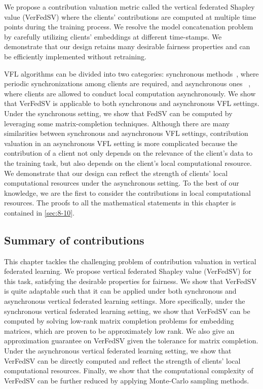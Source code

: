 We propose a contribution valuation metric called the vertical federated Shapley value (VerFedSV)
where the clients' contributions are computed at multiple time points during the training process. We resolve the model concatenation problem by carefully utilizing clients' embeddings at different time-stamps. 
We demonstrate that our design retains many desirable fairness properties and can be efficiently implemented without retraining. 

VFL algorithms can be divided into two categories: synchronous methods~\citep{Gong2016PrivateDA,Zhang2018FeatureDistributedSF,liu2019communication}, where periodic synchronizations
 among clients are required, and asynchronous ones
 ~\citep{Hu2019FDMLAC,Gu2020PrivacyPreservingAF,chen2020vafl}, where clients are allowed to conduct local computation asynchronously. We show that VerFedSV is applicable to both synchronous and asynchronous VFL settings. Under the synchronous setting, we show that FedSV can be computed by leveraging some matrix-completion techniques. Although there are many similarities between synchronous and asynchronous VFL settings, contribution valuation in an asynchronous VFL setting is more complicated because the contribution of a client not only depends on the relevance of the client's data to the training task, but also depends on the client's local computational resource. We demonstrate that our design can reflect the strength of clients' local computational resources under the asynchronous setting. To the best of our knowledge, we are the first to consider the contributions in local computational resources. The proofs to all the mathematical statements in this chapter is contained in \autoref{sec:8-10}.

 \subsection{Summary of contributions} \label{sec:8-9}

This chapter tackles the challenging problem of contribution valuation in vertical federated learning. We propose vertical federated Shapley value (VerFedSV) for this task, satisfying the desirable properties for fairness. We show that VerFedSV is quite adaptable such that it can be applied under both synchronous and asynchronous vertical federated learning settings. More specifically, under the synchronous vertical federated learning setting, we show that VerFedSV can be computed by solving low-rank matrix completion problems for embedding matrices, which are proven to be approximately low rank. We also give an approximation guarantee on VerFedSV given the tolerance for matrix completion. Under the asynchronous vertical federated learning setting, we show that VerFedSV can be directly computed and reflect the strength of clients' local computational resources. Finally, we show that the computational complexity of VerFedSV can be further reduced by applying Monte-Carlo sampling methods.

